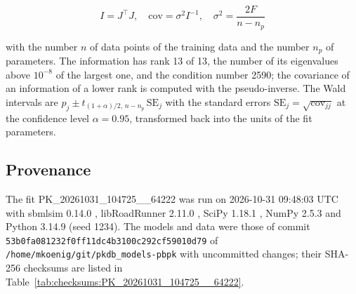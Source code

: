 \documentclass{article}
\begin{document}
\begin{equation}
I = J^\top J, \quad \mathrm{cov} = \sigma^2 I^{-1}, \quad \sigma^2 = \frac{2 F}{n - n_p}
\end{equation}

with the number $n$ of data points of the training data and the number $n_p$ of parameters. The information has rank 13 of 13, the number of its eigenvalues above $10^{-8}$ of the largest one, and the condition number 2590; the covariance of an information of a lower rank is computed with the pseudo-inverse. The Wald intervals are $\hat{p}_j \pm t_{(1+\alpha)/2,\, n-n_p}\, \mathrm{SE}_j$ with the standard errors $\mathrm{SE}_j = \sqrt{\mathrm{cov}_{jj}}$ at the confidence level $\alpha = 0.95$, transformed back into the units of the fit parameters.

\subsection{Provenance}

The fit PK\_20261031\_104725\_\_64222 was run on 2026-10-31 09:48:03 UTC with sbmlsim 0.14.0 \cite{Koenig2026_sbmlsim}, libRoadRunner 2.11.0 \cite{Welsh2023}, SciPy 1.18.1 \cite{Virtanen2020}, NumPy 2.5.3 \cite{Harris2020} and Python 3.14.9 (seed 1234). The models and data were those of commit \texttt{53b0fa081232f0ff11dc4b3100c292cf59010d79} of \texttt{/home/mkoenig/git/pkdb\_models-pbpk} with uncommitted changes; their SHA-256 checksums are listed in Table~\ref{tab:checksums:PK_20261031_104725__64222}.
\end{document}
